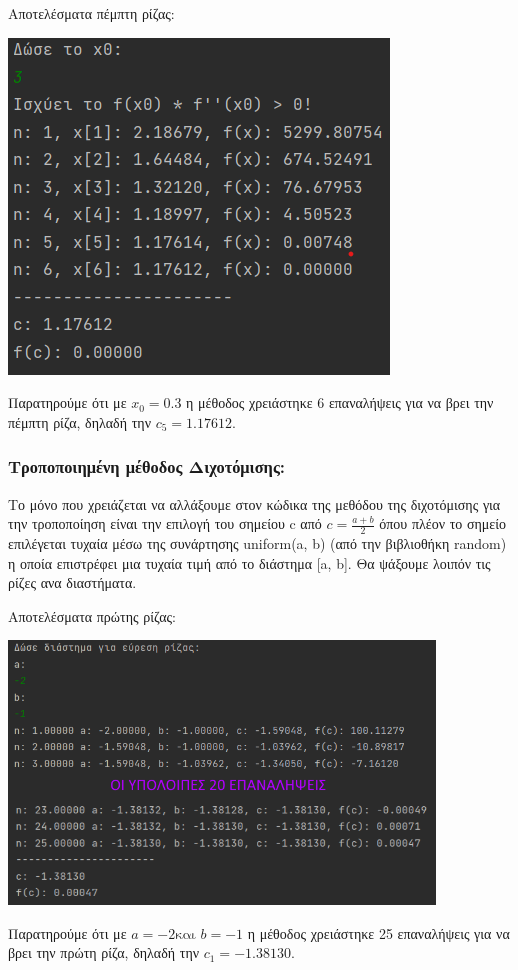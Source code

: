 \documentclass{article}
\begin{document}
    \pagebreak
    \vspace{3mm}
    Αποτελέσματα πέμπτη ρίζας: \\
    \begin{center}\includegraphics[]{images/results_12.png}\end{center}
    Παρατηρούμε ότι με \(x_0 = 0.3\) η μέθοδος χρειάστηκε 6 επαναλήψεις για να βρει την πέμπτη ρίζα, δηλαδή την \(c_5 = 1.17612\). 
    
    
    \subsubsection{Τροποποιημένη μέθοδος Διχοτόμισης:}
    Το μόνο που χρειάζεται να αλλάξουμε στον κώδικα της μεθόδου της διχοτόμισης για την τροποποίηση είναι την επιλογή του σημείου c από \(c = \frac{a+b}{2}\) όπου πλέον το σημείο επιλέγεται τυχαία μέσω της συνάρτησης uniform(a, b) (από την βιβλιοθήκη random) η οποία επιστρέφει μια τυχαία τιμή από το διάστημα [a, b]. Θα ψάξουμε λοιπόν τις ρίζες ανα διαστήματα.
    
    \pagebreak
    Αποτελέσματα πρώτης ρίζας: \\
    \begin{center}\includegraphics[height = 7cm]{images/results_13.png}\end{center}
    Παρατηρούμε ότι με \(a = -2 \text{και } b = -1\) η μέθοδος χρειάστηκε 25 επαναλήψεις για να βρει την πρώτη ρίζα, δηλαδή την \(c_1 = -1.38130\). 
    
\end{document}
